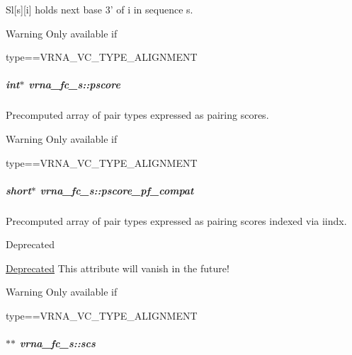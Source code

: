 Sl\mbox{[}s\mbox{]}\mbox{[}i\mbox{]} holds next base 3' of i in sequence s. 

\begin{DoxyWarning}{Warning}
Only available if\begin{DoxyVerb}type==VRNA_VC_TYPE_ALIGNMENT \end{DoxyVerb}
 
\end{DoxyWarning}
\hypertarget{group__fold__compound_a14dc7755af6019ddbd0cf94b209e89dd}{
\subparagraph[{pscore}]{\setlength{\rightskip}{0pt plus 5cm}int$\ast$ vrna\-\_\-fc\-\_\-s\-::pscore}}\label{group__fold__compound_a14dc7755af6019ddbd0cf94b209e89dd}


Precomputed array of pair types expressed as pairing scores. 

\begin{DoxyWarning}{Warning}
Only available if\begin{DoxyVerb}type==VRNA_VC_TYPE_ALIGNMENT \end{DoxyVerb}
 
\end{DoxyWarning}
\hypertarget{group__fold__compound_abf5e82d14649b6179ae60ed7da6e4fc0}{
\subparagraph[{pscore\-\_\-pf\-\_\-compat}]{\setlength{\rightskip}{0pt plus 5cm}short$\ast$ vrna\-\_\-fc\-\_\-s\-::pscore\-\_\-pf\-\_\-compat}}\label{group__fold__compound_abf5e82d14649b6179ae60ed7da6e4fc0}


Precomputed array of pair types expressed as pairing scores indexed via iindx. 

\begin{DoxyRefDesc}{Deprecated}
\item[\hyperlink{deprecated__deprecated000048}{Deprecated}]This attribute will vanish in the future! \begin{DoxyWarning}{Warning}
Only available if\begin{DoxyVerb}type==VRNA_VC_TYPE_ALIGNMENT \end{DoxyVerb}
 
\end{DoxyWarning}
\end{DoxyRefDesc}
\hypertarget{group__fold__compound_ac2b047fddabc51a76a96511174e47db1}{
\subparagraph[{scs}]{$\ast$$\ast$ vrna\-\_\-fc\-\_\-s\-::scs}}\label{group__fold__compound_ac2b047fddabc51a76a96511174e47db1}


